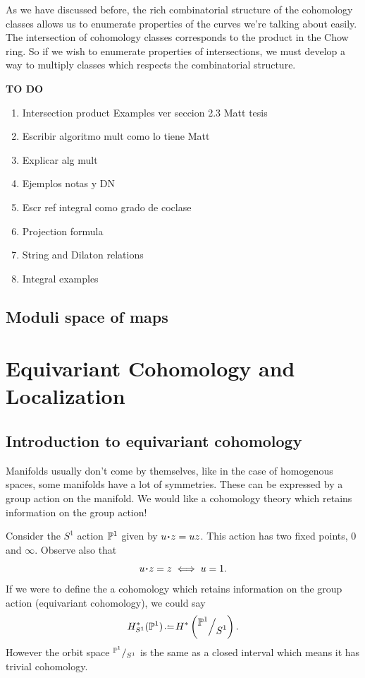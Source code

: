 \documentclass[12pt]{memoir}
\begin{document}
As we have discussed before, the rich combinatorial structure of the cohomology classes allows us to enumerate properties of the curves we're talking about easily. The intersection of cohomology classes corresponds to the product in the Chow ring. So if we wish to enumerate properties of intersections, we must develop a way to multiply classes which respects the combinatorial structure. 

\textbf{TO DO}
\begin{enumerate}
   
    \item Intersection product Examples ver seccion 2.3 Matt tesis
    \item Escribir algoritmo mult como lo tiene Matt
    \item Explicar alg mult
    \item Ejemplos notas y DN
    \item Escr ref integral como grado de coclase
    \item Projection formula
    \item String and Dilaton relations
    \item Integral examples
\end{enumerate}

\section{Moduli space of maps}

\chapter{Equivariant Cohomology and Localization}

\section{Introduction to equivariant cohomology}

Manifolds usually don't come by themselves, like in the case of homogenous spaces, some manifolds have a lot of symmetries. These can be expressed by a group action on the manifold. We would like a cohomology theory which retains information on the group action!

\begin{Ex}
    Consider the $S^1$ action $\mathbb{P}^1$ given by $u\. z=uz$. This action has two fixed points, $0$ and $\infty$. Observe also that 
    $$u\.z=z\iff u=1.$$
    If we were to define the a cohomology which retains information on the group action (equivariant cohomology), we could say 
    $$H_{S^1}^\ast(\bP^1)\defeq H^\ast\left(\quot{\bP^1}{S^1}\right).$$
    However the orbit space $\quot{\bP^1}{S^1}$ is the same as a closed interval which means it has trivial cohomology.
\end{Ex}
\end{document}

